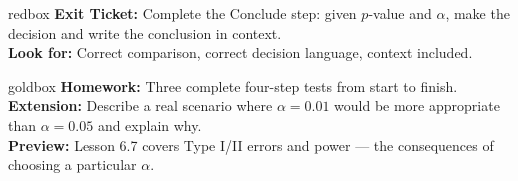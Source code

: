 \documentclass[10pt]{article}
\begin{document}
\begin{skillbox}{redbox}
    \textbf{Exit Ticket:} Complete the Conclude step: given $p$-value and $\alpha$, make the
    decision and write the conclusion in context. \\[4pt]
    \textbf{Look for:} Correct comparison, correct decision language, context included.
\end{skillbox}

\begin{skillbox}{goldbox}
    \textbf{Homework:} Three complete four-step tests from start to finish.\\[4pt]
    \textbf{Extension:} Describe a real scenario where $\alpha=0.01$ would be more appropriate
    than $\alpha=0.05$ and explain why.\\[4pt]
    \textbf{Preview:} Lesson 6.7 covers Type I/II errors and power --- the consequences of
    choosing a particular $\alpha$.
\end{skillbox}
\end{document}
